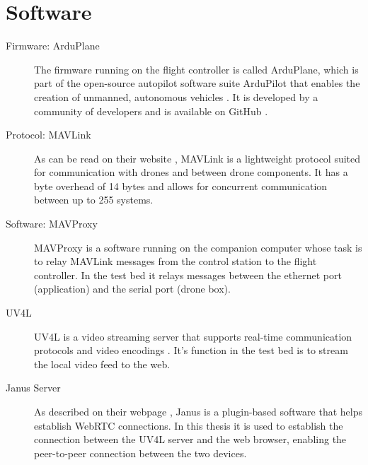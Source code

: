 \documentclass[nofilelist]{cslthse-msc}
\begin{document}
\section{Software}
\begin{description}
   \item[Firmware: ArduPlane]
   The firmware running on the flight controller is called ArduPlane, which is part of the open-source autopilot software suite ArduPilot that enables the creation of unmanned, autonomous vehicles \cite{ardupilot-org}. It is developed by a community of developers and is available on GitHub \cite{ardupilot-github}.
   
   \item[Protocol: MAVLink]
   As can be read on their website \cite{mavlink}, MAVLink is a lightweight protocol suited for communication with drones and between drone components. It has a byte overhead of 14 bytes and allows for concurrent communication between up to 255 systems. 

   \item [Software: MAVProxy]
   MAVProxy \cite{mavproxy} is a software running on the companion computer whose task is to relay MAVLink messages from the control station to the flight controller. In the test bed it relays messages between the ethernet port (application) and the serial port (drone box). 

   \item[UV4L]
   UV4L is a video streaming server that supports real-time communication protocols and video encodings \cite{uv4l}. It's function in the test bed is to stream the local video feed to the web. 
   
   \item[Janus Server]
   As described on their webpage \cite{janus}, Janus is a plugin-based software that helps establish WebRTC connections. In this thesis it is used to establish the connection between the UV4L server and the web browser, enabling the peer-to-peer connection between the two devices.
\end{description}
\end{document}
